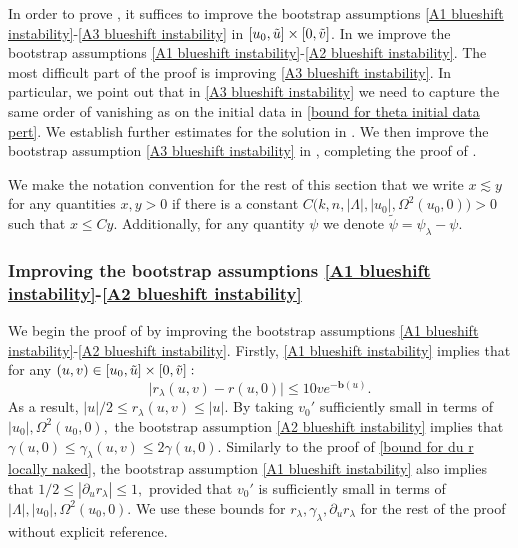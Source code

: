 \documentclass[11pt]{article}
\numberwithin{equation}{section}
\begin{document}
In order to prove , it suffices to improve the bootstrap assumptions \eqref{A1 blueshift instability}-\eqref{A3 blueshift instability} in $[u_0,\Tilde{u}]\times[0,\Tilde{v}]$. In  we improve the bootstrap assumptions \eqref{A1 blueshift instability}-\eqref{A2 blueshift instability}. The most difficult part of the proof is improving \eqref{A3 blueshift instability}. In particular, we point out that in \eqref{A3 blueshift instability} we need to capture the same order of vanishing as on the initial data in \eqref{bound for theta initial data pert}. We establish further estimates for the solution in . We then improve the bootstrap assumption \eqref{A3 blueshift instability} in , completing the proof of .

We make the notation convention for the rest of this section that we write $x\lesssim y$ for any quantities $x,y>0$ if there is a constant $C\big(k,n,|\Lambda|,|u_0|,\Omega^2(u_0,0)\big)>0$ such that $x\leq Cy.$ Additionally, for any quantity $\psi$ we denote $\widetilde{\psi}=\psi_{\lambda}-\psi.$

\subsubsection{Improving the bootstrap assumptions \eqref{A1 blueshift instability}-\eqref{A2 blueshift instability}}\label{A1 A2 section}
We begin the proof of  by improving the bootstrap assumptions \eqref{A1 blueshift instability}-\eqref{A2 blueshift instability}. Firstly, \eqref{A1 blueshift instability} implies that for any $(u,v)\in[u_0,\Tilde{u}]\times[0,\Tilde{v}]:$
\[\big|r_{\lambda}(u,v)-r(u,0)\big|\leq 10ve^{-\mathbf{b}(u)}.\]
As a result, $|u|/2\leq r_{\lambda}(u,v)\leq|u|.$ By taking $v_0'$ sufficiently small in terms of $|u_0|,\Omega^2(u_0,0),$ the bootstrap assumption \eqref{A2 blueshift instability} implies that $\gamma(u,0)\leq\gamma_{\lambda}(u,v)\leq2\gamma(u,0).$ Similarly to the proof of \eqref{bound for du r locally naked}, the bootstrap assumption \eqref{A1 blueshift instability} also implies that $1/2\leq|\partial_ur_{\lambda}|\leq1,$ provided that $v_0'$ is sufficiently small in terms of $|\Lambda|,|u_0|,\Omega^2(u_0,0).$ We use these bounds for $r_{\lambda},\gamma_{\lambda},\partial_ur_{\lambda}$ for the rest of the proof without explicit reference.
\end{document}
